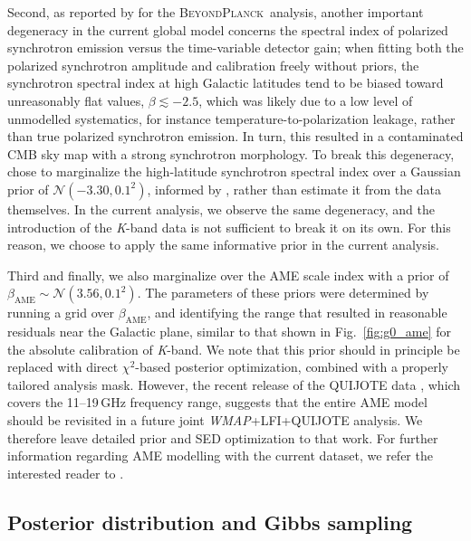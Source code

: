 \documentclass[twocolumn]{../../common/aa}
\def\WMAP{\emph{WMAP}}
\newcommand{\BP}{\textsc{BeyondPlanck}}
\newcommand{\K}[0]{\textit K}
\begin{document}
Second, as reported by \citet{bp14} for the \BP\ analysis, another important degeneracy in the current global model concerns the spectral index of polarized synchrotron emission versus the time-variable detector gain; when fitting both the polarized synchrotron amplitude and calibration freely without priors, the synchrotron spectral index at high Galactic latitudes tend to be biased toward unreasonably flat values, $\beta \lesssim -2.5$, which was likely due to a low level of unmodelled systematics, for instance temperature-to-polarization leakage, rather than true polarized synchrotron emission. In turn, this resulted in a contaminated CMB sky map with a strong synchrotron morphology. To break this degeneracy, \citet{bp14} chose to marginalize the high-latitude synchrotron spectral index over a Gaussian prior of $\mathcal N(-3.30,0.1^2)$, informed by \citet{planck2016-l05}, rather than estimate it from the data themselves. In the current analysis, we observe the same degeneracy, and the introduction of the \K-band data is not sufficient to break it on its own. For this reason, we choose to apply the same informative prior in the current analysis.

Third and finally, we also marginalize over the AME scale index with a prior of $\beta_{\mathrm{AME}}\sim\mathcal N(3.56, 0.1^2)$. The parameters of these priors were determined by running a grid over $\beta_{\mathrm{AME}}$, and identifying the range that resulted in reasonable residuals near the Galactic plane, similar to that shown in Fig.~\ref{fig:g0_ame} for the absolute calibration of \K-band. We note that this prior should in principle be replaced with direct $\chi^2$-based posterior optimization, combined with a properly tailored analysis mask. However, the recent release of the QUIJOTE data \citep{QUIJOTE_IV}, which covers the 11--19\,GHz frequency range, suggests that the entire AME model should be revisited in a future joint \WMAP+LFI+QUIJOTE analysis. We therefore leave detailed prior and SED optimization to that work. For further information regarding AME modelling with the current dataset, we refer the interested reader to \citet{watts2023_ame}.

\subsection{Posterior distribution and Gibbs sampling}
\end{document}
